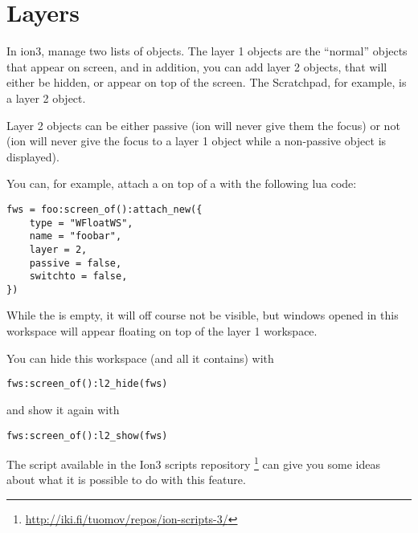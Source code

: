 \section{Layers}

In ion3,  manage two lists of objects. The layer 1
objects are the ``normal'' objects that appear on screen, and in
addition, you can add layer 2 objects, that will either be hidden, or
appear on top of the screen. The Scratchpad, for example, is a layer 2
object.

Layer 2 objects can be either passive (ion will never give them the
focus) or not (ion will never give the focus to a layer 1 object while
a non-passive object is displayed).

You can, for example, attach a  on top of a
 with the following lua code:

\begin{verbatim}
fws = foo:screen_of():attach_new({
    type = "WFloatWS",
    name = "foobar",
    layer = 2,
    passive = false,
    switchto = false,
})
\end{verbatim}

While the  is empty, it will off course not be visible,
but windows opened in this workspace will appear floating on top of
the layer 1 workspace.

You can hide this workspace (and all it contains) with

\begin{verbatim}
fws:screen_of():l2_hide(fws)
\end{verbatim}

and show it again with

\begin{verbatim}
fws:screen_of():l2_show(fws)
\end{verbatim}

The script  available in the Ion3 scripts repository%
\footnote{\url{http://iki.fi/tuomov/repos/ion-scripts-3/}}
can give you some ideas about what it is possible to do with this feature.

